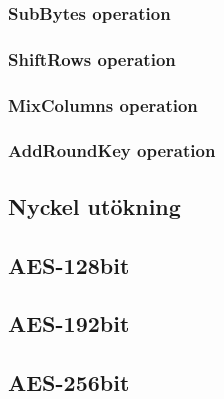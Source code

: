 \subsubsection{SubBytes operation}


\subsubsection{ShiftRows operation}


\subsubsection{MixColumns operation}


\subsubsection{AddRoundKey operation}


\subsection{Nyckel utökning}


\subsection{AES-128bit}


\subsection{AES-192bit}


\subsection{AES-256bit}

